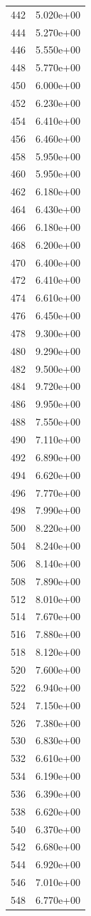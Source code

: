 \documentclass[12pt]{article}
\begin{document}
\begin{longtable}{@{}cc@{}}
442 & 5.020e+00 \\
444 & 5.270e+00 \\
446 & 5.550e+00 \\
448 & 5.770e+00 \\
450 & 6.000e+00 \\
452 & 6.230e+00 \\
454 & 6.410e+00 \\
456 & 6.460e+00 \\
458 & 5.950e+00 \\
460 & 5.950e+00 \\
462 & 6.180e+00 \\
464 & 6.430e+00 \\
466 & 6.180e+00 \\
468 & 6.200e+00 \\
470 & 6.400e+00 \\
472 & 6.410e+00 \\
474 & 6.610e+00 \\
476 & 6.450e+00 \\
478 & 9.300e+00 \\
480 & 9.290e+00 \\
482 & 9.500e+00 \\
484 & 9.720e+00 \\
486 & 9.950e+00 \\
488 & 7.550e+00 \\
490 & 7.110e+00 \\
492 & 6.890e+00 \\
494 & 6.620e+00 \\
496 & 7.770e+00 \\
498 & 7.990e+00 \\
500 & 8.220e+00 \\
504 & 8.240e+00 \\
506 & 8.140e+00 \\
508 & 7.890e+00 \\
512 & 8.010e+00 \\
514 & 7.670e+00 \\
516 & 7.880e+00 \\
518 & 8.120e+00 \\
520 & 7.600e+00 \\
522 & 6.940e+00 \\
524 & 7.150e+00 \\
526 & 7.380e+00 \\
530 & 6.830e+00 \\
532 & 6.610e+00 \\
534 & 6.190e+00 \\
536 & 6.390e+00 \\
538 & 6.620e+00 \\
540 & 6.370e+00 \\
542 & 6.680e+00 \\
544 & 6.920e+00 \\
546 & 7.010e+00 \\
548 & 6.770e+00 \\

\bottomrule
\end{longtable}
\end{document}
